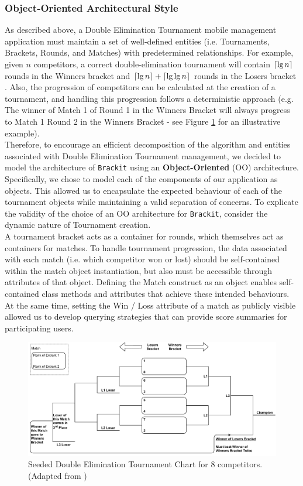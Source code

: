 \documentclass{article}
\DeclarePairedDelimiter{\ceil}{\lceil}{\rceil}
\begin{document}
\subsubsection{Object-Oriented Architectural Style}
\label{sssec:ooas}
As described above, a Double Elimination Tournament mobile management application must maintain a set of well-defined entities (i.e. Tournaments, Brackets, Rounds, and Matches) with predetermined relationships. For example, given $n$ competitors, a correct double-elimination tournament will contain $\ceil{\lg n}$ rounds in the Winners bracket and $\ceil{\lg n} + 
\ceil{\lg \lg n}$ rounds in the Losers bracket \cite{de_formula}. Also, the progression of competitors can be calculated at the creation of a tournament, and handling this progression follows a deterministic approach (e.g. The winner of Match 1 of Round 1 in the Winners Bracket will always progress to Match 1 Round 2 in the Winners Bracket - see Figure \ref{fig:deb} for an illustrative example).\\
Therefore, to encourage an efficient decomposition of the algorithm and entities associated with Double Elimination Tournament management, we decided to model the architecture of \texttt{Brackit} using an \textbf{Object-Oriented} (OO) architecture. 
Specifically, we chose to model each of the components of our application as objects. This allowed us to encapsulate the expected behaviour of each of the tournament objects while maintaining a valid separation of concerns. To explicate the validity of the choice of an OO architecture for \texttt{Brackit}, consider the dynamic nature of Tournament creation.\\
A tournament bracket acts as a container for rounds, which themselves act as containers for matches.
To handle tournament progression, the data associated with each match (i.e. which competitor won or lost) should be self-contained within the match object instantiation, but also must be accessible through attributes of that object. Defining the Match construct as an object enables self-contained class methods and attributes that achieve these intended behaviours. At the same time, setting the Win / Loss attribute of a match as publicly visible allowed us to develop querying strategies that can provide score summaries for participating users. 
    \begin{figure}[htp]
        \centering
        \includegraphics[width=12cm]{../diagrams/double_elim_bracket_comp.pdf}
        \caption{Seeded Double Elimination Tournament Chart for 8 competitors. (Adapted from \cite{se:tba})}
        \label{fig:deb}
        \end{figure}
\end{document}
